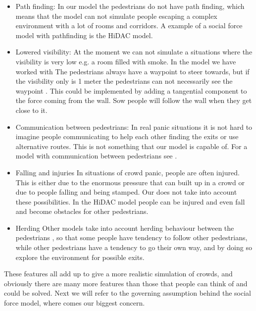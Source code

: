 \begin{itemize}
\item {Path finding: } 
In our model the pedestrians do not have path finding, which means that the model 
can not simulate people escaping a complex environment with a lot of rooms 
and corridors. A example of a social force model with pathfinding is the HiDAC 
model\cite{HiDAC}.

\item {Lowered visibility: }
At the moment we can not simulate a situations where the visibility is very low 
e.g. a room filled with smoke. In the model we have worked with The pedestrians always 
have a waypoint to steer towards, but if the visibility only is 1 meter the 
pedestrians can not necessarily see the waypoint \cite{HelbingNew}. This could be 
implemented by adding a tangential component to the force coming from the wall. 
Sow people will follow the wall when they get close to it.

\item {Communication between pedestrians: }
In real panic situations it is not hard to imagine people communicating to help each 
other finding the exits or use alternative routes. This is 
not something that our model is capable of. For a model with communication between 
pedestrians see \cite{HiDAC}.

\item {Falling and injuries }
In situations of crowd panic, people are often injured. This is either due to the 
enormous pressure that can built up in a crowd or due to people falling and being stamped. Our 
does not take into account these possibilities. In the HiDAC model people can 
be injured and even fall and become obstacles for other pedestrians.\cite{HiDAC}

\item {Herding}
Other models take into account herding behaviour between the pedestrians 
\cite{helbing00}, so that some people have tendency to follow other pedestrians, 
while other pedestrians have a tendency to go their own way,  and by doing so 
explore the environment for possible exits.

\end{itemize}

These features all add up to give a more realistic simulation of crowds, and 
obviously there are many more features than those that people can think of 
and could be solved. 
Next we will refer to the governing assumption behind the social force
model, where comes our biggest concern.

